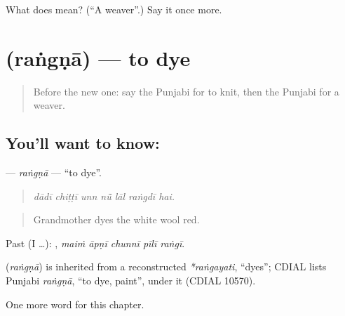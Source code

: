 \begin{tcolorbox}[breakable,colback=teal!4,colframe=teal!35!black,title={Before you move on}]
What does  mean? (\textquotedblleft{}A weaver\textquotedblright{}.) Say it once more.
\end{tcolorbox}
\section[\texorpdfstring{\pa{ਰੰਗਣਾ} (raṅgṇā)}{ਰੰਗਣਾ (raṅgṇā)}]{ (raṅgṇā) — to dye}

\label{lesson:PA-C334-rangna}



\begin{quote}
Before the new one: say the Punjabi for to knit, then the Punjabi for a weaver.
\end{quote}

\subsection*{You'll want to know: }
\textbf{} — \emph{raṅgṇā} — \textquotedblleft{}to dye\textquotedblright{}.

\begin{quote}
      
\end{quote}

\begin{quote}
\emph{dādī chiṭṭī unn nū̃ lāl raṅgdī hai.}
\end{quote}

\begin{quote}
Grandmother dyes the white wool red.
\end{quote}

Past (I …):     , \emph{maiṁ āpṇī chunnī pīlī raṅgī}.

\begin{cousinweb}
\textbf{} (\emph{raṅgṇā}) is inherited from a reconstructed \emph{*raṅgayati}, \textquotedblleft{}dyes\textquotedblright{}; CDIAL lists Punjabi \emph{raṅgṇā}, \textquotedblleft{}to dye, paint\textquotedblright{}, under it (CDIAL 10570).
\end{cousinweb}

\begin{grammarlens}[title={What you've built}]
One more word for this chapter.
\end{grammarlens}

